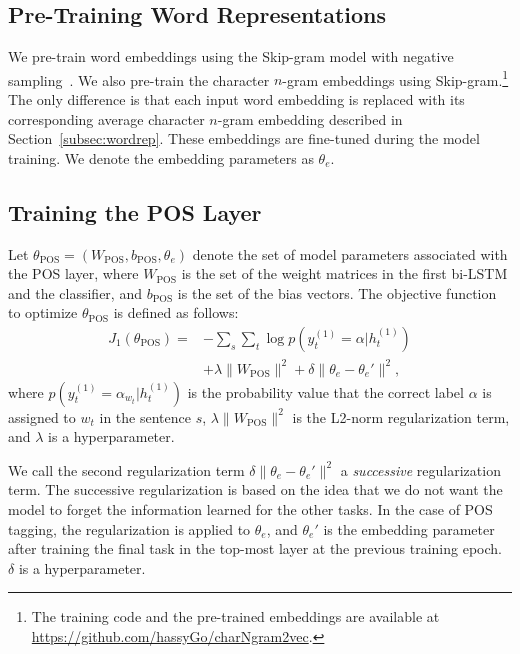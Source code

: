 \documentclass[11pt,a4paper]{article}
\begin{document}
\subsection{Pre-Training Word Representations}
\label{sec:trainingCharVecs}
We pre-train word embeddings using the Skip-gram model with negative sampling~\citep{mikolov2013word2vec}.
We also pre-train the character $n$-gram embeddings using Skip-gram.\footnote{The training code and the pre-trained embeddings are available at \url{https://github.com/hassyGo/charNgram2vec}.}
The only difference is that each input word embedding is replaced with its corresponding average character $n$-gram embedding described in Section~\ref{subsec:wordrep}.
These embeddings are fine-tuned during the model training.
We denote the embedding parameters as $\theta_{e}$.

\subsection{Training the POS Layer}
\label{subsec:trainingPOS}
Let $\theta_{\mathrm{POS}}=(W_{\mathrm{POS}}, b_{\mathrm{POS}}, \theta_{e})$ denote the set of model parameters associated with the POS layer, where $W_{\mathrm{POS}}$ is the set of the weight matrices in the first bi-LSTM and the classifier, and $b_{\mathrm{POS}}$ is the set of the bias vectors.
The objective function to optimize $\theta_{\mathrm{POS}}$ is defined as follows:
\begin{equation}
\begin{split}
J_1(\theta_{\mathrm{POS}})=&-\sum_{s}\sum_{t}\log{p(y_t^{(1)}=\alpha|h_t^{(1)})}\\
&+\lambda\|W_{\mathrm{POS}}\|^2+\delta\|\theta_{e}-\theta_{e}'\|^2,
\end{split}
\end{equation}
where $p(y_t^{(1)}=\alpha_{w_t}|h_t^{(1)})$ is the probability value that the correct label $\alpha$ is assigned to $w_t$ in the sentence $s$, $\lambda\|W_{\mathrm{POS}}\|^2$ is the L2-norm regularization term, and $\lambda$ is a hyperparameter.

We call the second regularization term $\delta\|\theta_{e}-\theta_{e}'\|^2$ a {\it successive} regularization term.
The successive regularization is based on the idea that we do not want the model to forget the information learned for the other tasks.
In the case of POS tagging, the regularization is applied to $\theta_{e}$, and $\theta_{e}'$ is the embedding parameter after training the final task in the top-most layer at the previous training epoch.
$\delta$ is a hyperparameter.
\end{document}
